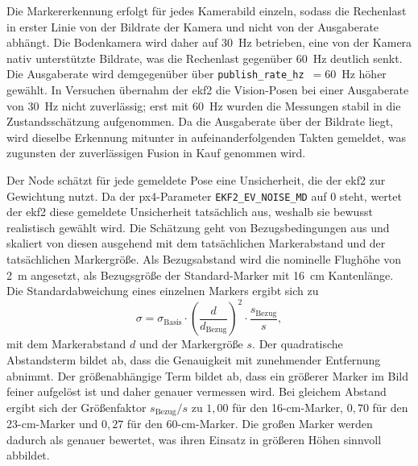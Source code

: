 Die Markererkennung erfolgt für jedes Kamerabild einzeln, sodass die Rechenlast in erster Linie von der Bildrate der Kamera und nicht von der Ausgaberate abhängt.
Die Bodenkamera wird daher auf 30~Hz betrieben, eine von der Kamera nativ unterstützte Bildrate, was die Rechenlast gegenüber 60~Hz deutlich senkt.
Die Ausgaberate wird demgegenüber über \texttt{publish\_rate\_hz}~$=60$~Hz höher gewählt.
In Versuchen übernahm der \gls{ekf2} die Vision-Posen bei einer Ausgaberate von 30~Hz nicht zuverlässig; erst mit 60~Hz wurden die Messungen stabil in die Zustandsschätzung aufgenommen.
Da die Ausgaberate über der Bildrate liegt, wird dieselbe Erkennung mitunter in aufeinanderfolgenden Takten gemeldet, was zugunsten der zuverlässigen Fusion in Kauf genommen wird.

Der Node schätzt für jede gemeldete Pose eine Unsicherheit, die der \gls{ekf2} zur Gewichtung nutzt.
Da der \gls{px4}-Parameter \texttt{EKF2\_EV\_NOISE\_MD} auf $0$ steht, wertet der \gls{ekf2} diese gemeldete Unsicherheit tatsächlich aus, weshalb sie bewusst realistisch gewählt wird.
Die Schätzung geht von Bezugsbedingungen aus und skaliert von diesen ausgehend mit dem tatsächlichen Markerabstand und der tatsächlichen Markergröße.
Als Bezugsabstand wird die nominelle Flughöhe von 2~m angesetzt, als Bezugsgröße der Standard-Marker mit 16~cm Kantenlänge.
Die Standardabweichung eines einzelnen Markers ergibt sich zu
\begin{equation}
\sigma = \sigma_\text{Basis}\cdot\left(\frac{d}{d_\text{Bezug}}\right)^{2}\cdot\frac{s_\text{Bezug}}{s},
\label{eq:sigma_scaling}
\end{equation}
mit dem Markerabstand $d$ und der Markergröße $s$.
Der quadratische Abstandsterm bildet ab, dass die Genauigkeit mit zunehmender Entfernung abnimmt.
Der größenabhängige Term bildet ab, dass ein größerer Marker im Bild feiner aufgelöst ist und daher genauer vermessen wird.
Bei gleichem Abstand ergibt sich der Größenfaktor $s_\text{Bezug}/s$ zu $1{,}00$ für den 16-cm-Marker, $0{,}70$ für den 23-cm-Marker und $0{,}27$ für den 60-cm-Marker.
Die großen Marker werden dadurch als genauer bewertet, was ihren Einsatz in größeren Höhen sinnvoll abbildet.

